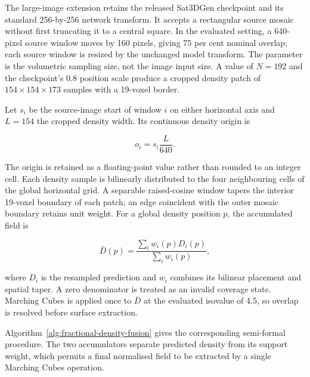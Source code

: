The large-image extension retains the released Sat3DGen checkpoint and its
standard 256-by-256 network transform.  It accepts a rectangular source mosaic
without first truncating it to a central square.  In the evaluated setting, a
640-pixel source window moves by 160 pixels, giving 75 per cent nominal overlap;
each source window is resized by the unchanged model transform.  The
 parameter is the volumetric sampling size, not the image
input size.  A value of $N=192$ and the checkpoint's 0.8 position scale produce
a cropped density patch of $154\times154\times173$ samples with a 19-voxel
border.

Let $s_i$ be the source-image start of window $i$ on either horizontal axis and
$L=154$ the cropped density width.  Its continuous density origin is

\begin{equation}
o_i=s_i\frac{L}{640}.
\end{equation}

The origin is retained as a floating-point value rather than rounded to an
integer cell.  Each density sample is bilinearly distributed to the four
neighbouring cells of the global horizontal grid.  A separable raised-cosine
window tapers the interior 19-voxel boundary of each patch; an edge coincident
with the outer mosaic boundary retains unit weight.  For a global density
position $p$, the accumulated field is

\begin{equation}
\bar{D}(p)=\frac{\sum_i w_i(p)D_i(p)}{\sum_i w_i(p)},
\label{eq:density-feather-fusion}
\end{equation}

where $D_i$ is the resampled prediction and $w_i$ combines its bilinear
placement and spatial taper.  A zero denominator is treated as an invalid
coverage state.  Marching Cubes is applied once to $\bar{D}$ at the evaluated
isovalue of 4.5, so overlap is resolved before surface extraction.

Algorithm~\ref{alg:fractional-density-fusion} gives the corresponding
semi-formal procedure.  The two accumulators separate predicted density from
its support weight, which permits a final normalised field to be extracted by
a single Marching Cubes operation.

